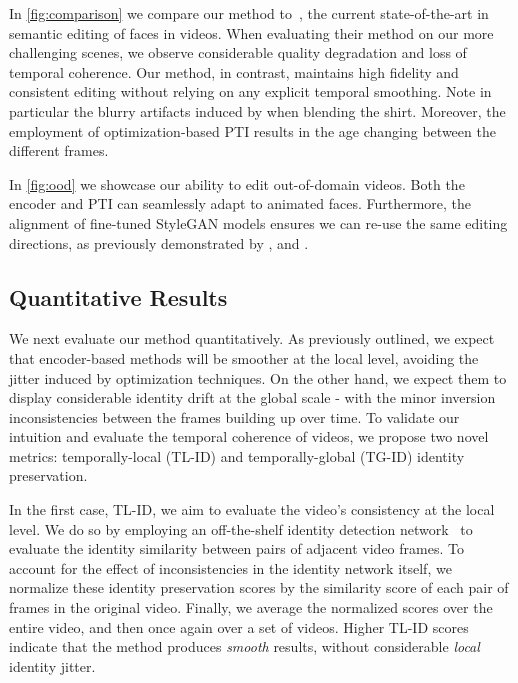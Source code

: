 In \cref{fig:comparison} we compare our method to~\cite{yao2021latent}, the current state-of-the-art in semantic editing of faces in videos. 
When evaluating their method on our more challenging scenes, we observe considerable quality degradation and loss of temporal coherence. Our method, in contrast, maintains high fidelity and consistent editing without relying on any explicit temporal smoothing.
Note in particular the blurry artifacts induced by \cite{yao2021latent} when blending the shirt. Moreover, the employment of optimization-based PTI results in the age changing between the different frames.



In \cref{fig:ood} we showcase our ability to edit out-of-domain videos. Both the encoder and PTI can seamlessly adapt to animated faces. Furthermore, the alignment of fine-tuned StyleGAN models ensures we can re-use the same editing directions, as previously demonstrated by \cite{gal2021stylegannada}, \cite{alaluf2021hyperstyle} and \cite{zhu2021mind}.


\subsection{Quantitative Results}
\label{sec:quantitative}

We next evaluate our method quantitatively. As previously outlined, we expect that encoder-based methods will be smoother at the local level, avoiding the jitter induced by optimization techniques. On the other hand, we expect them to display considerable identity drift at the global scale - with the minor inversion inconsistencies between the frames building up over time. To validate our intuition and evaluate the temporal coherence of videos, we propose two novel metrics: temporally-local (TL-ID) and temporally-global (TG-ID) identity preservation. 


In the first case, TL-ID, we aim to evaluate the video's consistency at the local level. We do so by employing an off-the-shelf identity detection network~\cite{deng2019arcface} to evaluate the identity similarity between pairs of adjacent video frames. To account for the effect of inconsistencies in the identity network itself, we normalize these identity preservation scores by the similarity score of each pair of frames in the original video. Finally, we average the normalized scores over the entire video, and then once again over a set of videos.
Higher TL-ID scores indicate that the method produces \textit{smooth} results, without considerable \textit{local} identity jitter. 


